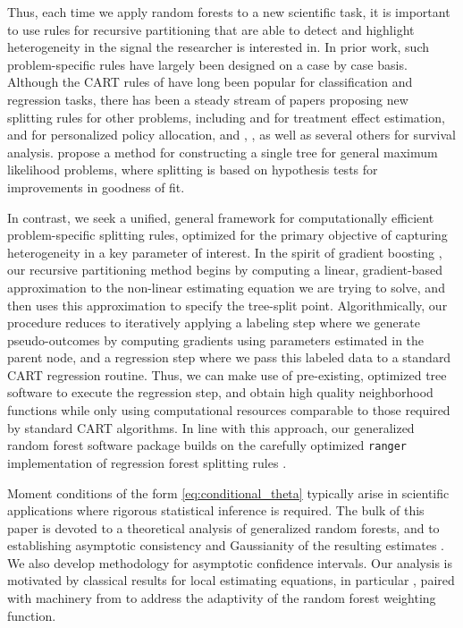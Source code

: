 \documentclass[aos]{imsart}
\theoremstyle{plain}
\theoremstyle{definition}
\theoremstyle{remark}
\begin{document}
\begin{CJK}{UTF8}{gbsn}
Thus, each time we apply random forests to a new scientific task, it is important to use rules for recursive partitioning
that are able to detect and highlight heterogeneity in the signal the researcher is interested in.
In prior work, such problem-specific rules have largely been designed on a case by case basis.
Although the CART rules of \citet{breiman1984classification}
have long been popular for classification and regression tasks, there has been a steady
stream of papers proposing new splitting rules for other problems, including \citet{athey2016recursive}
and \citet{su2009subgroup} for treatment effect estimation, \citet{beygelzimer2009offset}
and \citet{kallus2016learning} for personalized policy allocation, and
\citet{gordon1985tree}, \citet{leblanc1992relative}, \citet{molinaro2004tree} as well as several others
for survival analysis. \citet{zeileis2008model} propose a method
for constructing a single tree for general maximum likelihood problems, where splitting is based on
hypothesis tests for improvements in goodness of fit.

In contrast, we seek a unified, general framework for computationally efficient problem-specific splitting rules,
optimized for the primary objective of capturing heterogeneity in a key parameter of interest.
In the spirit of gradient boosting \citep{friedman2001greedy}, our recursive partitioning
method begins by computing a linear, gradient-based approximation to the
non-linear estimating equation we are trying to solve, and then uses
this approximation to specify the tree-split point. Algorithmically, our procedure
reduces to iteratively applying a labeling step where we generate pseudo-outcomes
by computing gradients using parameters estimated in the parent node, and a regression step where we pass this labeled data
to a standard CART regression routine.  Thus, we can make use of pre-existing,
optimized tree software to execute the regression step, and obtain high quality
neighborhood functions while only using computational
resources comparable to those required by standard CART algorithms.  
In line with this approach, our generalized random forest software package
builds on the carefully optimized \texttt{ranger}
implementation of regression forest splitting rules \citep{wright2015ranger}.

Moment conditions of the form \eqref{eq:conditional_theta} typically arise in
scientific applications where rigorous statistical inference is required.
The bulk of this paper is devoted to a theoretical analysis of generalized random
forests, and to establishing asymptotic consistency and Gaussianity of the resulting
estimates . We also develop methodology for asymptotic confidence
intervals. Our analysis is motivated by classical results for local estimating equations,
in particular \citet{newey1994kernel}, paired with machinery from
\citet{wager2015estimation} to address the adaptivity of the random forest weighting function.


\end{CJK}
\end{document}
